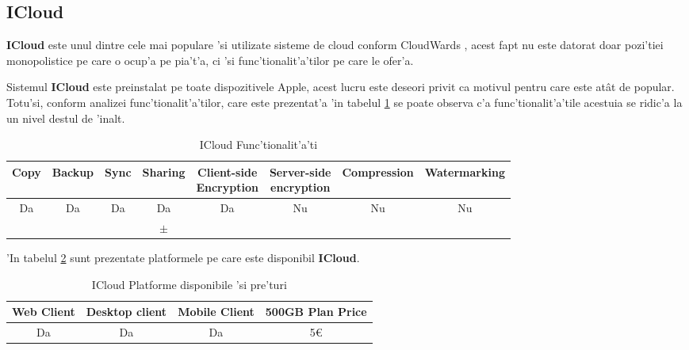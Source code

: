 \documentclass[12pt,a4paper,twoside]{report}
\newcommand{\greencheck}{\color{green}  \ding{51}}
\newcommand{\orangepm}{\color{orange} \textbf{$\pm$}}
\newcommand{\redxmark}{\color{red} \ding{55}}
\begin{document}
\subsection{ICloud}
\textbf{ICloud} este unul dintre cele mai populare 'si utilizate sisteme de cloud conform CloudWards \cite{icloud_drive}, acest fapt nu este datorat doar pozi'tiei monopolistice pe care o ocup'a pe pia't'a, ci 'si func'tionalit'a'tilor pe care le ofer'a.

Sistemul \textbf{ICloud} este preinstalat pe toate dispozitivele Apple, acest lucru este deseori privit ca motivul pentru care este atât de popular. Totu'si, conform analizei func'tionalit'a'tilor, care este prezentat'a 'in tabelul \ref{table:icloudfeaturetable} se poate observa c'a func'tionalit'a'tile acestuia se ridic'a la un nivel destul de 'inalt.
\begin{table}[H]
\small
\centering
\caption{ICloud Func'tionalit'a'ti}
\begin{tabular}{|c|c|c|c|c|c|c|c|}          
\hline               
Copy & Backup & Sync & Sharing & \makecell{Client-side\\ Encryption} & \makecell{Server-side \\ encryption} & Compression & Watermarking \\ [0.5ex]   
\hline 
Da & Da & Da & Da & Da & Nu & Nu & Nu    \\                      
\greencheck & \greencheck & \greencheck\greencheck & \orangepm & \greencheck\greencheck & \redxmark\redxmark &  \redxmark\redxmark &  \redxmark\redxmark  \\               
\hline                              
\end{tabular}
\label{table:icloudfeaturetable}             
\end{table}
\begin{table}[H]
'In tabelul \ref{table:icloudsystemtable} sunt prezentate platformele pe care este disponibil \textbf{ICloud}.
\centering
\caption{ICloud Platforme disponibile 'si pre'turi}
\begin{tabular}{|c|c|c|c|}          
\hline                      
 Web Client & Desktop client & Mobile Client & 500GB Plan Price\\ [0.5ex]   
\hline                            
Da & Da & Da & 5\euro \\               
\hline                              
\end{tabular}
\label{table:icloudsystemtable}             
\end{table}
\end{document}
